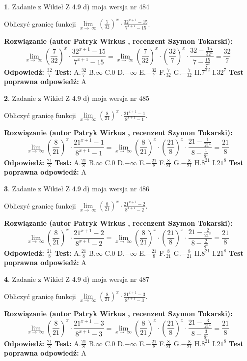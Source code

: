 \documentclass[12pt, a4paper]{article}
\theoremstyle{definition} %
\newtheorem{zad}{}
\newcommand{\zadStart}[1]{\begin{zad}#1\newline}
\newcommand{\zadStop}{\end{zad}}
\newcommand{\rozwStart}[2]{\noindent \textbf{Rozwiązanie (autor #1 , recenzent #2): }\newline}
\newcommand{\rozwStop}{\newline}
\newcommand{\odpStart}{\noindent \textbf{Odpowiedź:}\newline}
\newcommand{\odpStop}{\newline}
\newcommand{\testStart}{\noindent \textbf{Test:}\newline}
\newcommand{\testStop}{\newline}
\newcommand{\kluczStart}{\noindent \textbf{Test poprawna odpowiedź:}\newline}
\newcommand{\kluczStop}{\newline}
\begin{document}
\zadStart{Zadanie z Wikieł Z 4.9 d) moja wersja nr 484}


Obliczyć granicę funkcji  $\lim\limits_{x\to\ \infty}(\frac{7}{32})^{x}\cdot\frac{32^{x+1}-15}{7^{x+1}-15}$.
\zadStop
\rozwStart{Patryk Wirkus}{Szymon Tokarski}
$$\lim\limits_{x\to\ \infty}(\frac{7}{32})^{x}\cdot\frac{32^{x+1}-15}{7^{x+1}-15}=\lim\limits_{x\to\ \infty}(\frac{7}{32})^{x}\cdot(\frac{32}{7})^{x} \cdot \frac{32-\frac{15}{32^{x}}}{7-\frac{15}{7^{x}}} = \frac{32}{7}$$
\rozwStop
\odpStart
$\frac{32}{7}$
\odpStop
\testStart
A.$\frac{32}{7}$ B.$\infty$ C.$0$ D.$-\infty$ E.$-\frac{32}{7}$
F.$\frac{7}{32}$ G.$-\frac{7}{32}$
H.$7^{32}$
I.$32^{7}$
\testStop
\kluczStart
A
\kluczStop



\zadStart{Zadanie z Wikieł Z 4.9 d) moja wersja nr 485}


Obliczyć granicę funkcji  $\lim\limits_{x\to\ \infty}(\frac{8}{21})^{x}\cdot\frac{21^{x+1}-1}{8^{x+1}-1}$.
\zadStop
\rozwStart{Patryk Wirkus}{Szymon Tokarski}
$$\lim\limits_{x\to\ \infty}(\frac{8}{21})^{x}\cdot\frac{21^{x+1}-1}{8^{x+1}-1}=\lim\limits_{x\to\ \infty}(\frac{8}{21})^{x}\cdot(\frac{21}{8})^{x} \cdot \frac{21-\frac{1}{21^{x}}}{8-\frac{1}{8^{x}}} = \frac{21}{8}$$
\rozwStop
\odpStart
$\frac{21}{8}$
\odpStop
\testStart
A.$\frac{21}{8}$ B.$\infty$ C.$0$ D.$-\infty$ E.$-\frac{21}{8}$
F.$\frac{8}{21}$ G.$-\frac{8}{21}$
H.$8^{21}$
I.$21^{8}$
\testStop
\kluczStart
A
\kluczStop



\zadStart{Zadanie z Wikieł Z 4.9 d) moja wersja nr 486}


Obliczyć granicę funkcji  $\lim\limits_{x\to\ \infty}(\frac{8}{21})^{x}\cdot\frac{21^{x+1}-2}{8^{x+1}-2}$.
\zadStop
\rozwStart{Patryk Wirkus}{Szymon Tokarski}
$$\lim\limits_{x\to\ \infty}(\frac{8}{21})^{x}\cdot\frac{21^{x+1}-2}{8^{x+1}-2}=\lim\limits_{x\to\ \infty}(\frac{8}{21})^{x}\cdot(\frac{21}{8})^{x} \cdot \frac{21-\frac{2}{21^{x}}}{8-\frac{2}{8^{x}}} = \frac{21}{8}$$
\rozwStop
\odpStart
$\frac{21}{8}$
\odpStop
\testStart
A.$\frac{21}{8}$ B.$\infty$ C.$0$ D.$-\infty$ E.$-\frac{21}{8}$
F.$\frac{8}{21}$ G.$-\frac{8}{21}$
H.$8^{21}$
I.$21^{8}$
\testStop
\kluczStart
A
\kluczStop



\zadStart{Zadanie z Wikieł Z 4.9 d) moja wersja nr 487}


Obliczyć granicę funkcji  $\lim\limits_{x\to\ \infty}(\frac{8}{21})^{x}\cdot\frac{21^{x+1}-3}{8^{x+1}-3}$.
\zadStop
\rozwStart{Patryk Wirkus}{Szymon Tokarski}
$$\lim\limits_{x\to\ \infty}(\frac{8}{21})^{x}\cdot\frac{21^{x+1}-3}{8^{x+1}-3}=\lim\limits_{x\to\ \infty}(\frac{8}{21})^{x}\cdot(\frac{21}{8})^{x} \cdot \frac{21-\frac{3}{21^{x}}}{8-\frac{3}{8^{x}}} = \frac{21}{8}$$
\rozwStop
\odpStart
$\frac{21}{8}$
\odpStop
\testStart
A.$\frac{21}{8}$ B.$\infty$ C.$0$ D.$-\infty$ E.$-\frac{21}{8}$
F.$\frac{8}{21}$ G.$-\frac{8}{21}$
H.$8^{21}$
I.$21^{8}$
\testStop
\kluczStart
A
\kluczStop
\end{document}
